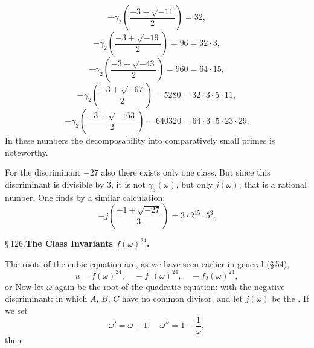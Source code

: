 \[
-\gamma_2\left(\frac{-3+\sqrt{-11}}{2}\right) = 32,
\]
\[
-\gamma_2\left(\frac{-3+\sqrt{-19}}{2}\right) = 96 = 32\cdot 3,
\]
\[
-\gamma_2\left(\frac{-3+\sqrt{-43}}{2}\right) = 960 = 64\cdot 15,
\]
\[
-\gamma_2\left(\frac{-3+\sqrt{-67}}{2}\right) = 5280 = 32\cdot 3\cdot 5\cdot 11,
\]
\[
-\gamma_2\left(\frac{-3+\sqrt{-163}}{2}\right) = 640320 = 64\cdot 3\cdot 5\cdot 23\cdot 29.
\]
In these numbers the decomposability into comparatively small primes is noteworthy.

For the discriminant $-27$ also there exists only one class. But since this discriminant is divisible by 3, it is not $\gamma_3(\omega)$, but only $j(\omega)$, that is a rational number. One finds by a similar calculation:
\[
-j\left(\frac{-1+\sqrt{-27}}{3}\right) = 3\cdot 2^{15}\cdot 5^3.
\]

\S\,126.\quad\textbf{The Class Invariants $f(\omega)^{24}$.}

The roots of the cubic equation
are, as we have seen earlier in general (\S\,54),
\[
u = f(\omega)^{24}, \quad -f_1(\omega)^{24}, \quad -f_2(\omega)^{24},
\]
or
Now let $\omega$ again be the root of the quadratic equation:
with the negative discriminant:
in which $A$, $B$, $C$ have no common divisor, and let $j(\omega)$ be the . If we set
\[
\omega' = \omega+1, \quad \omega'' = 1-\frac{1}{\omega},
\]
then
